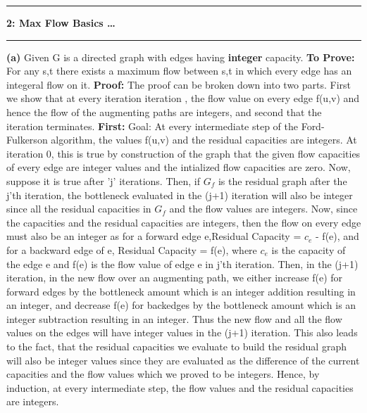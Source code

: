 \documentclass{article}
\newcommand\question[2]{\vspace{.25in}\hrule\textbf{#1: #2}\hrule\vspace{.10in}}
\renewcommand\part[1]{\vspace{.10in}\textbf{(#1)}}
\begin{document}
    \question{2}{Max Flow Basics \dots}
    \part{a} Given G is a directed graph with edges having \textbf {integer} capacity. \newline
    \textbf {To Prove:} For any s,t there exists a maximum flow between s,t in which every edge has an integeral flow on it. \newline
    \textbf {Proof:} The proof can be broken down into two parts. First we show that at every iteration iteration , the flow value on every edge f(u,v) and hence the flow of the augmenting paths are integers, and second that the iteration terminates. \newline
    \textbf {First:} Goal: At every intermediate step of the Ford-Fulkerson algorithm, the values f(u,v) and the residual capacities are integers. \newline
    \hspace*{0.5cm} At iteration 0, this is true by construction of the graph that the given flow capacities of every edge are integer values and the intialized flow capacities are zero. Now, suppose it is true after 'j' iterations. Then, if $G_f$ is the residual graph after the j'th iteration, the bottleneck evaluated in the (j+1) iteration will also be integer since all the residual capacities in $G_{f}$ and the flow values are integers. Now, since the capacities and the residual capacities are integers, then the flow on every edge must also be an integer as for a forward edge e,Residual Capacity = $c_e$ - f(e), and for a backward edge of e, Residual Capacity = f(e), where $c_e$ is the capacity of the edge e and f(e) is the flow value of edge e in j'th iteration. Then, in the (j+1) iteration, in the new flow over an augmenting path, we either increase f(e) for forward edges by the bottleneck amount which is an integer addition resulting in an integer, and decrease f(e) for backedges by the bottleneck amount which is an integer subtraction resulting in an integer. Thus the new flow and all the flow values on the edges will have integer values in the (j+1) iteration. This also leads to the fact, that the residual capacities we evaluate to build the residual graph will also be integer values since they are evaluated as the difference of the current capacities and the flow values which we proved to be integers. Hence, by induction, at every intermediate step, the flow values and the residual capacities are integers. \newline
\end{document}
